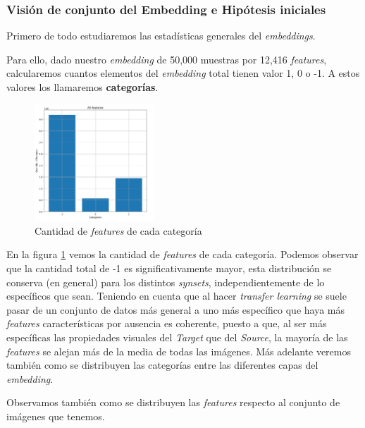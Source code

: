 \documentclass[12,twoside]{TFG-GM}
\theoremstyle{definition}
\theoremstyle{remark}
\begin{document}
\subsubsection{Visión de conjunto del Embedding e Hipótesis iniciales}
Primero de todo estudiaremos las estadísticas generales del \textit{embeddings}.

Para ello, dado nuestro \textit{embedding} de 50,000 muestras por 12,416 \textit{features}, calcularemos cuantos elementos del \textit{embedding} total tienen valor 1, 0 o -1. A estos valores los llamaremos \textbf{categorías}. 

\begin{figure}[h] 
	\centering
	\includegraphics[width=0.4\textwidth] {Images/plots/25/quantity_of_features_bar.png}
	\caption{ Cantidad de \textit{features} de cada categoría
	\label{fig:totalfeatures}}


\end{figure}

En la figura \ref{fig:totalfeatures} vemos la cantidad de \textit{features} de cada categoría. Podemos observar que la cantidad total de -1 es significativamente mayor, esta distribución se conserva (en general) para los distintos \textit{synsets}, independientemente de lo específicos que sean. Teniendo en cuenta que al hacer \textit{transfer learning} se suele pasar de un conjunto de datos más general a uno más específico que haya más \textit{features} características por ausencia es coherente, puesto a que, al ser más específicas las propiedades visuales del \textit{Target} que del \textit{Source}, la mayoría de las \textit{features} se alejan más de la media de todas las imágenes. Más adelante veremos también como se distribuyen las categorías entre las diferentes capas del \textit{embedding}. 


Observamos también como se distribuyen las \textit{features} respecto al conjunto de imágenes que tenemos. 
\end{document}
